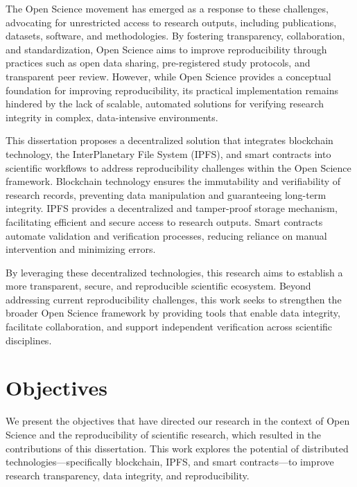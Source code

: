 \documentclass[final]{rc-book-2.14}
\begin{document}
The Open Science movement has emerged as a response to these challenges, advocating for unrestricted access to research outputs, including publications, datasets, software, and methodologies. By fostering transparency, collaboration, and standardization, Open Science aims to improve reproducibility through practices such as open data sharing, pre-registered study protocols, and transparent peer review. However, while Open Science provides a conceptual foundation for improving reproducibility, its practical implementation remains hindered by the lack of scalable, automated solutions for verifying research integrity in complex, data-intensive environments.

This dissertation proposes a decentralized solution that integrates blockchain technology, the InterPlanetary File System (IPFS), and smart contracts into scientific workflows to address reproducibility challenges within the Open Science framework. Blockchain technology ensures the immutability and verifiability of research records, preventing data manipulation and guaranteeing long-term integrity. IPFS provides a decentralized and tamper-proof storage mechanism, facilitating efficient and secure access to research outputs. Smart contracts automate validation and verification processes, reducing reliance on manual intervention and minimizing errors.

By leveraging these decentralized technologies, this research aims to establish a more transparent, secure, and reproducible scientific ecosystem. Beyond addressing current reproducibility challenges, this work seeks to strengthen the broader Open Science framework by providing tools that enable data integrity, facilitate collaboration, and support independent verification across scientific disciplines.


\section{Objectives}
\label{chp:intro:sec:objectives}

We present the objectives that have directed our research in the context of Open Science and the reproducibility of scientific research, which resulted in the contributions of this dissertation. This work explores the potential of distributed technologies—specifically blockchain, IPFS, and smart contracts—to improve research transparency, data integrity, and reproducibility.
\end{document}
